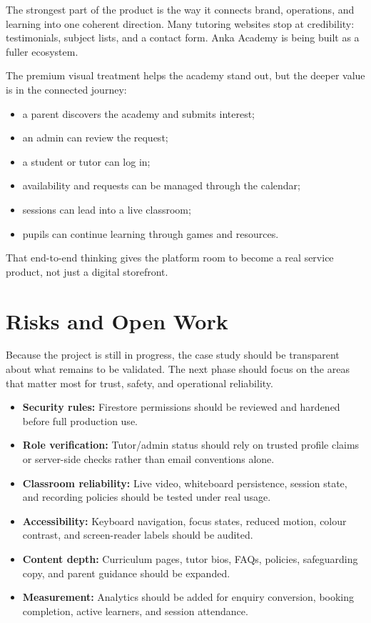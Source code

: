 \documentclass[11pt,a4paper]{article}
\begin{document}
The strongest part of the product is the way it connects brand, operations, and learning into one coherent direction. Many tutoring websites stop at credibility: testimonials, subject lists, and a contact form. Anka Academy is being built as a fuller ecosystem.

The premium visual treatment helps the academy stand out, but the deeper value is in the connected journey:

\begin{itemize}
    \item a parent discovers the academy and submits interest;
    \item an admin can review the request;
    \item a student or tutor can log in;
    \item availability and requests can be managed through the calendar;
    \item sessions can lead into a live classroom;
    \item pupils can continue learning through games and resources.
\end{itemize}

That end-to-end thinking gives the platform room to become a real service product, not just a digital storefront.

\section{Risks and Open Work}

Because the project is still in progress, the case study should be transparent about what remains to be validated. The next phase should focus on the areas that matter most for trust, safety, and operational reliability.

\begin{itemize}
    \item \textbf{Security rules:} Firestore permissions should be reviewed and hardened before full production use.
    \item \textbf{Role verification:} Tutor/admin status should rely on trusted profile claims or server-side checks rather than email conventions alone.
    \item \textbf{Classroom reliability:} Live video, whiteboard persistence, session state, and recording policies should be tested under real usage.
    \item \textbf{Accessibility:} Keyboard navigation, focus states, reduced motion, colour contrast, and screen-reader labels should be audited.
    \item \textbf{Content depth:} Curriculum pages, tutor bios, FAQs, policies, safeguarding copy, and parent guidance should be expanded.
    \item \textbf{Measurement:} Analytics should be added for enquiry conversion, booking completion, active learners, and session attendance.
\end{itemize}
\end{document}
